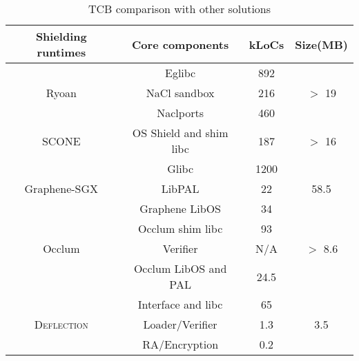 
\begin{table}[htbp]
\footnotesize
\caption{TCB comparison with other solutions}\label{tb-tcb}
\vspace{-8pt}
\begin{center}
\begin{tabular}{|c|c|c|c|}
\hline
\textbf{Shielding runtimes} & \textbf{Core components} & kLoCs & \textbf{Size(MB)} \\
\hline
 & Eglibc & 892 & \\
Ryoan & NaCl sandbox & 216 & $>$ 19 \\
 & Naclports & 460 & \\
\hline
SCONE & OS Shield and shim libc & 187 & $>$ 16 \\
\hline
 & Glibc & 1200 & \\
Graphene-SGX & LibPAL & 22 & 58.5 \\
 & Graphene LibOS & 34 & \\
\hline
 & Occlum shim libc & 93 & \\
Occlum & Verifier & N/A & $>$ 8.6 \\
 & Occlum LibOS and PAL & 24.5 & \\
\hline
 & Interface and libc & 65  & \\
\textsc{Deflection} & Loader/Verifier & 1.3 & 3.5 \\ 
 & RA/Encryption & 0.2 & \\
\hline
\end{tabular}
\end{center}
\vspace{-10pt}
\end{table}







